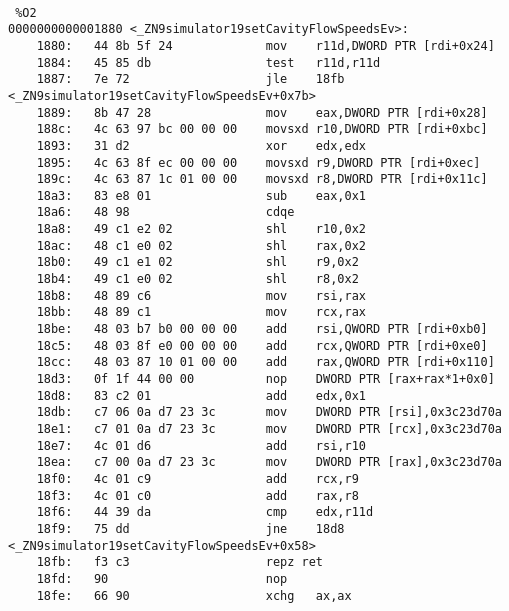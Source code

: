 ~\\

\begin{verbatim} %O2
0000000000001880 <_ZN9simulator19setCavityFlowSpeedsEv>:
    1880:   44 8b 5f 24             mov    r11d,DWORD PTR [rdi+0x24]
    1884:   45 85 db                test   r11d,r11d
    1887:   7e 72                   jle    18fb <_ZN9simulator19setCavityFlowSpeedsEv+0x7b>
    1889:   8b 47 28                mov    eax,DWORD PTR [rdi+0x28]
    188c:   4c 63 97 bc 00 00 00    movsxd r10,DWORD PTR [rdi+0xbc]
    1893:   31 d2                   xor    edx,edx
    1895:   4c 63 8f ec 00 00 00    movsxd r9,DWORD PTR [rdi+0xec]
    189c:   4c 63 87 1c 01 00 00    movsxd r8,DWORD PTR [rdi+0x11c]
    18a3:   83 e8 01                sub    eax,0x1
    18a6:   48 98                   cdqe   
    18a8:   49 c1 e2 02             shl    r10,0x2
    18ac:   48 c1 e0 02             shl    rax,0x2
    18b0:   49 c1 e1 02             shl    r9,0x2
    18b4:   49 c1 e0 02             shl    r8,0x2
    18b8:   48 89 c6                mov    rsi,rax
    18bb:   48 89 c1                mov    rcx,rax
    18be:   48 03 b7 b0 00 00 00    add    rsi,QWORD PTR [rdi+0xb0]
    18c5:   48 03 8f e0 00 00 00    add    rcx,QWORD PTR [rdi+0xe0]
    18cc:   48 03 87 10 01 00 00    add    rax,QWORD PTR [rdi+0x110]
    18d3:   0f 1f 44 00 00          nop    DWORD PTR [rax+rax*1+0x0]
    18d8:   83 c2 01                add    edx,0x1
    18db:   c7 06 0a d7 23 3c       mov    DWORD PTR [rsi],0x3c23d70a
    18e1:   c7 01 0a d7 23 3c       mov    DWORD PTR [rcx],0x3c23d70a
    18e7:   4c 01 d6                add    rsi,r10
    18ea:   c7 00 0a d7 23 3c       mov    DWORD PTR [rax],0x3c23d70a
    18f0:   4c 01 c9                add    rcx,r9
    18f3:   4c 01 c0                add    rax,r8
    18f6:   44 39 da                cmp    edx,r11d
    18f9:   75 dd                   jne    18d8 <_ZN9simulator19setCavityFlowSpeedsEv+0x58>
    18fb:   f3 c3                   repz ret 
    18fd:   90                      nop
    18fe:   66 90                   xchg   ax,ax

\end{verbatim} %


